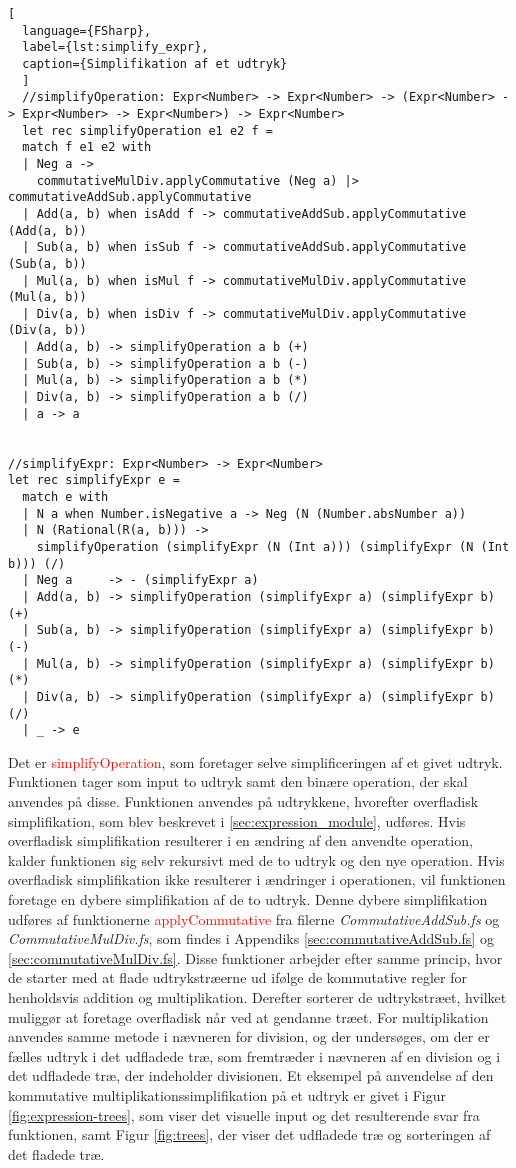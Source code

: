 \documentclass{article}
\begin{document}
\begin{lstlisting}[
  language={FSharp}, 
  label={lst:simplify_expr}, 
  caption={Simplifikation af et udtryk}
  ]
  //simplifyOperation: Expr<Number> -> Expr<Number> -> (Expr<Number> -> Expr<Number> -> Expr<Number>) -> Expr<Number>
  let rec simplifyOperation e1 e2 f = 
  match f e1 e2 with
  | Neg a -> 
    commutativeMulDiv.applyCommutative (Neg a) |> commutativeAddSub.applyCommutative
  | Add(a, b) when isAdd f -> commutativeAddSub.applyCommutative (Add(a, b))
  | Sub(a, b) when isSub f -> commutativeAddSub.applyCommutative (Sub(a, b))
  | Mul(a, b) when isMul f -> commutativeMulDiv.applyCommutative (Mul(a, b))
  | Div(a, b) when isDiv f -> commutativeMulDiv.applyCommutative (Div(a, b))
  | Add(a, b) -> simplifyOperation a b (+)
  | Sub(a, b) -> simplifyOperation a b (-)
  | Mul(a, b) -> simplifyOperation a b (*)
  | Div(a, b) -> simplifyOperation a b (/)
  | a -> a


//simplifyExpr: Expr<Number> -> Expr<Number>
let rec simplifyExpr e =
  match e with
  | N a when Number.isNegative a -> Neg (N (Number.absNumber a))
  | N (Rational(R(a, b))) -> 
    simplifyOperation (simplifyExpr (N (Int a))) (simplifyExpr (N (Int b))) (/)
  | Neg a     -> - (simplifyExpr a)
  | Add(a, b) -> simplifyOperation (simplifyExpr a) (simplifyExpr b) (+)
  | Sub(a, b) -> simplifyOperation (simplifyExpr a) (simplifyExpr b) (-)
  | Mul(a, b) -> simplifyOperation (simplifyExpr a) (simplifyExpr b) (*)
  | Div(a, b) -> simplifyOperation (simplifyExpr a) (simplifyExpr b) (/)
  | _ -> e 
\end{lstlisting}

Det er \textcolor{red}{simplifyOperation}, som foretager selve simplificeringen af et givet udtryk. Funktionen tager som input to udtryk samt den binære operation, der skal anvendes på disse. Funktionen anvendes på udtrykkene, hvorefter overfladisk simplifikation, som blev beskrevet i \ref{sec:expression_module}, udføres. Hvis overfladisk simplifikation resulterer i en ændring af den anvendte operation, kalder funktionen sig selv rekursivt med de to udtryk og den nye operation. Hvis overfladisk simplifikation ikke resulterer i ændringer i operationen, vil funktionen foretage en dybere simplifikation af de to udtryk. Denne dybere simplifikation udføres af funktionerne \textcolor{red}{applyCommutative} fra filerne \textit{CommutativeAddSub.fs} og \textit{CommutativeMulDiv.fs}, som findes i Appendiks \ref{sec:commutativeAddSub.fs} og \ref{sec:commutativeMulDiv.fs}. Disse funktioner arbejder efter samme princip, hvor de starter med at flade udtrykstræerne ud ifølge de kommutative regler for henholdsvis addition og multiplikation. Derefter sorterer de udtrykstræet, hvilket muliggør at foretage overfladisk når ved at gendanne træet. For multiplikation anvendes samme metode i nævneren for division, og der undersøges, om der er fælles udtryk i det udfladede træ, som fremtræder i nævneren af en division og i det udfladede træ, der indeholder divisionen. Et eksempel på anvendelse af den kommutative multiplikationssimplifikation på et udtryk er givet i Figur \ref{fig:expression-trees}, som viser det visuelle input og det resulterende svar fra funktionen, samt Figur \ref{fig:trees}, der viser det udfladede træ og sorteringen af det fladede træ.
\end{document}
